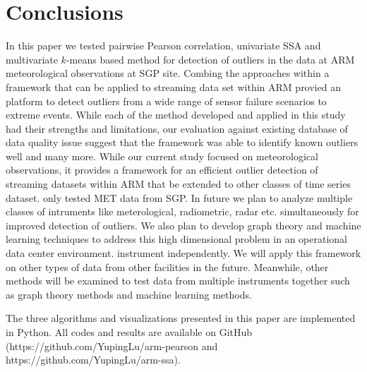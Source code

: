 \section{Conclusions}
In this paper we tested pairwise Pearson correlation,
univariate SSA and multivariate $k$-means based method for detection of
outliers in the data at ARM meteorological observations at SGP site. 
Combing the approaches within a framework that can be applied to
streaming data set within ARM provied an platform to detect outliers
from a wide range of sensor failure scenarios to extreme events.
While each of the method developed and applied in this study had their
strengths and limitations, our evaluation against existing database of
data quality issue suggest that the framework was able to identify known
outliers well and many more. While our current study focused on
meteorological observations, it provides a framework for an efficient
outlier detection of streaming datasets within ARM that be extended to
other classes of time series dataset.
only tested MET data from SGP. In future we plan to analyze multiple
classes of intruments like meterological, radiometric, radar etc.
simultaneously for improved detection of outliers. We also plan to
develop graph theory and machine learning techniques to address this
high dimensional problem in an operational data center environment. 
instrument independently. We will apply this framework on other types
of data from other facilities in the future. Meanwhile, other methods
will be examined to test data from multiple instruments together such
as graph theory methods \cite{phillips2015graph} and machine learning
methods. 

The three algorithms and visualizations presented in this paper are 
implemented in Python. All codes and results are available on GitHub 
(https://github.com/YupingLu/arm-pearson and https://github.com/YupingLu/arm-ssa). 
